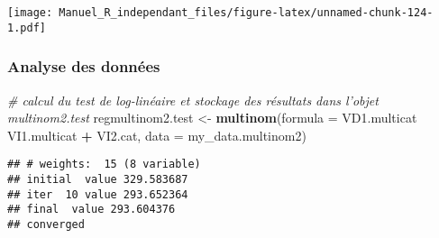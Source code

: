 \documentclass[
]{book}
\newenvironment{Shaded}{\begin{snugshade}}{\end{snugshade}}
\newcommand{\CommentTok}[1]{\textcolor[rgb]{0.56,0.35,0.01}{\textit{#1}}}
\newcommand{\DataTypeTok}[1]{\textcolor[rgb]{0.13,0.29,0.53}{#1}}
\newcommand{\KeywordTok}[1]{\textcolor[rgb]{0.13,0.29,0.53}{\textbf{#1}}}
\newcommand{\NormalTok}[1]{#1}
\newcommand{\OperatorTok}[1]{\textcolor[rgb]{0.81,0.36,0.00}{\textbf{#1}}}
\newcommand{\StringTok}[1]{\textcolor[rgb]{0.31,0.60,0.02}{#1}}
\begin{document}
\texttt{[image: Manuel\_R\_independant\_files/figure-latex/unnamed-chunk-124-1.pdf]}

\hypertarget{analyse-des-donnuxe9es-14}{%
\subsubsection{Analyse des données}\label{analyse-des-donnuxe9es-14}}

\begin{Shaded}
\begin{Highlighting}[]
\CommentTok{# calcul du test de log-linéaire  et stockage des résultats dans l’objet multinom2.test}
\NormalTok{regmultinom2.test <-}\StringTok{ }\KeywordTok{multinom}\NormalTok{(}\DataTypeTok{formula =}\NormalTok{ VD1.multicat  }\OperatorTok{~}\StringTok{ }\NormalTok{VI1.multicat }\OperatorTok{+}\StringTok{ }\NormalTok{VI2.cat, }
                    \DataTypeTok{data =}\NormalTok{ my_data.multinom2)}
\end{Highlighting}
\end{Shaded}

\begin{verbatim}
## # weights:  15 (8 variable)
## initial  value 329.583687 
## iter  10 value 293.652364
## final  value 293.604376 
## converged
\end{verbatim}
\end{document}
